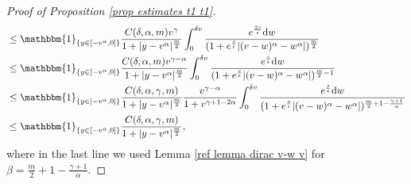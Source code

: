 \documentclass[11pt]{article}
\numberwithin{equation}{section}
\newcommand{\der}{\textup{d}}
\begin{document}
\begin{proof}[Proof of Proposition 
\ref{prop estimates t1 t1}]
\begin{align*}
       &\leq   \mathbbm{1}_{\{y\in[-v^{\alpha},0]\}}\frac{C(\delta,\alpha,m)v^{\gamma}}{1+|y-v^{\alpha}|^{\frac{m}{2}}}\int_{0}^{\delta v}\frac{e^{\frac{2s}{\epsilon}}\der w}{(1+e^{\frac{s}{\epsilon}}|(v-w)^{\alpha}-w^{\alpha}|)^{\frac{m}{2}}} \\
       &   \leq   \mathbbm{1}_{\{y\in[-v^{\alpha},0]\}}\frac{C(\delta,\alpha,m)v^{\gamma-\alpha}}{1+|y-v^{\alpha}|^{\frac{m}{2}}}\int_{0}^{\delta v}\frac{e^{\frac{s}{\epsilon}}\der w}{(1+e^{\frac{s}{\epsilon}}|(v-w)^{\alpha}-w^{\alpha}|)^{\frac{m}{2}-1}}  \\
       &\leq   \mathbbm{1}_{\{y\in[-v^{\alpha},0]\}}\frac{C(\delta,\alpha,\gamma,m)}{1+|y-v^{\alpha}|^{\frac{m}{2}}}\frac{v^{\gamma-\alpha}}{1+v^{\gamma+1-2\alpha}}\int_{0}^{\delta v}\frac{e^{\frac{s}{\epsilon}}\der w}{(1+e^{\frac{s}{\epsilon}}|(v-w)^{\alpha}-w^{\alpha}|)^{\frac{m}{2}+1-\frac{\gamma+1}{\alpha}}} \\
       &\leq  \mathbbm{1}_{\{y\in[-v^{\alpha},0]\}} \frac{C(\delta,\alpha,\gamma,m)}{1+|y-v^{\alpha}|^{\frac{m}{2}}},  
\end{align*}
where in the last line we used Lemma \ref{ref lemma dirac v-w v} for $\beta=\frac{m}{2}+1-\frac{\gamma+1}{\alpha}$.



\end{proof}
\end{document}
